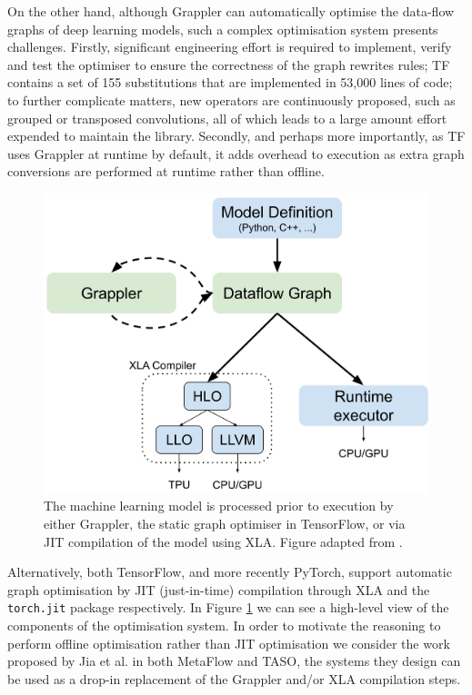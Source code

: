 On the other hand, although Grappler can automatically optimise the data-flow graphs of deep learning models, such a complex optimisation system presents challenges. Firstly, significant engineering effort is required to implement, verify and test the optimiser to ensure the correctness of the graph rewrites rules; TF contains a set of 155 substitutions that are implemented in 53,000 lines of code; to further complicate matters, new operators are continuously proposed, such as grouped or transposed convolutions, all of which leads to a large amount effort expended to maintain the library. Secondly, and perhaps more importantly, as TF uses Grappler at runtime by default, it adds overhead to execution as extra graph conversions are performed at runtime rather than offline.

\begin{figure}[ht]
  \centering
  \includegraphics[width=0.75\columnwidth]{sections/3problem/images/GraphOptimiser.jpg}
  \caption[Architecture of graph optimisation system in TensorFlow]{The machine learning model is processed prior to execution by either Grappler, the static graph optimiser in TensorFlow, or via JIT compilation of the model using XLA. Figure adapted from \cite{larsen2019tensorflow}.}
  \label{fig:problem:graph-optim}
\end{figure}

Alternatively, both TensorFlow, and more recently PyTorch, support automatic graph optimisation by JIT (just-in-time) compilation through XLA and the \texttt{torch.jit} package respectively. In Figure \ref{fig:problem:graph-optim} we can see a high-level view of the components of the optimisation system. In order to motivate the reasoning to perform offline optimisation rather than JIT optimisation we  consider the work proposed by Jia et al. in both MetaFlow and TASO, the systems they design can be used as a drop-in replacement of the Grappler and/or XLA compilation steps.

